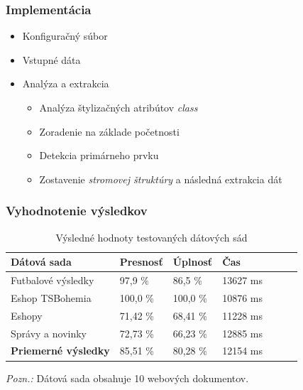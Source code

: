 \documentclass[10pt,xcolor=pdflatex]{beamer}
\begin{document}
\begin{frame}\frametitle{Implementácia}
    \begin{itemize}
        \item Konfiguračný súbor
        \bigskip
        \item Vstupné dáta
        \bigskip
        \item Analýza a extrakcia
        \bigskip
            \begin{itemize}
                \item Analýza štylizačných atribútov \emph{class}
                \bigskip
                \item Zoradenie na základe početnosti
                \bigskip
                \item Detekcia primárneho prvku
                \bigskip
                \item Zostavenie \emph{stromovej štruktúry} a následná extrakcia dát
            \end{itemize}
    \end{itemize}
\end{frame}

\begin{frame}\frametitle{Vyhodnotenie výsledkov}
    \bgroup
    \def\arraystretch{1.5}
    \begin{table}[hbt]
        \caption{Výsledné hodnoty testovaných dátových sád}
        \centering
        \begin{tabular}{|l|l|l|l|l|l|l|}
        \hline
        \textbf{Dátová sada}          & \textbf{Presnosť} & \textbf{Úplnosť}  & \textbf{Čas} \\ \hline
        Futbalové výsledky   & 97,9 \%   & 86,5 \%  & 13627 ms \\ \hline
        Eshop TSBohemia      & 100,0 \%  & 100,0 \% & 10876 ms \\ \hline
        Eshopy               & 71,42 \%  & 68,41 \% & 11228 ms \\ \hline
        Správy a novinky     & 72,73 \%  & 66,23 \% & 12885 ms \\ \hline \hline \hline
        \textbf{Priemerné výsledky}  & 85,51 \%  & 80,28 \% & 12154 ms \\ \hline
        \end{tabular}
    \end{table}
    \egroup
    \emph{Pozn.:} Dátová sada obsahuje 10 webových dokumentov.
\end{frame}

\end{document}
